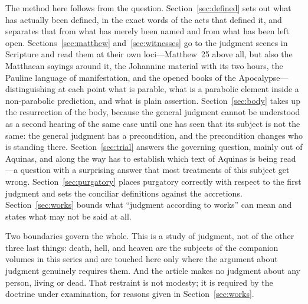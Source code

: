 The method here follows from the question. Section~\ref{sec:defined} sets out what has actually been defined, in the exact words of the acts that defined it, and separates that from what has merely been named and from what has been left open. Sections~\ref{sec:matthew} and~\ref{sec:witnesses} go to the judgment scenes in Scripture and read them at their own loci---Matthew~25 above all, but also the Matthaean sayings around it, the Johannine material with its two hours, the Pauline language of manifestation, and the opened books of the Apocalypse---distinguishing at each point what is parable, what is a parabolic element inside a non-parabolic prediction, and what is plain assertion. Section~\ref{sec:body} takes up the resurrection of the body, because the general judgment cannot be understood as a second hearing of the same case until one has seen that its subject is not the same: the general judgment has a precondition, and the precondition changes who is standing there. Section~\ref{sec:trial} answers the governing question, mainly out of Aquinas, and along the way has to establish which text of Aquinas is being read---a question with a surprising answer that most treatments of this subject get wrong. Section~\ref{sec:purgatory} places purgatory correctly with respect to the first judgment and sets the conciliar definitions against the accretions. Section~\ref{sec:works} bounds what ``judgment according to works'' can mean and states what may not be said at all.

Two boundaries govern the whole. This is a study of judgment, not of the other three last things: death, hell, and heaven are the subjects of the companion volumes in this series and are touched here only where the argument about judgment genuinely requires them. And the article makes no judgment about any person, living or dead. That restraint is not modesty; it is required by the doctrine under examination, for reasons given in Section~\ref{sec:works}.
